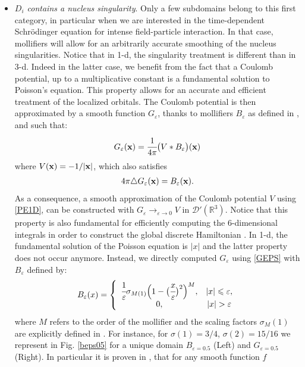 \documentclass[11pt]{elsarticle}
\let \leq \leqslant
\let \epsilon \varepsilon
\newcommand{\R} {\ensuremath{\mathbb{R}}}
\begin{document}
\begin{itemize}
\item {\it $D_i$ contains a nucleus singularity}. Only a few subdomains belong to this first category, in particular when we are interested in the time-dependent Schr\"odinger equation for intense field-particle interaction. In that case, mollifiers will allow for an arbitrarily accurate smoothing of the nucleus singularities. Notice that in 1-d, the singularity treatment is different than in 3-d. Indeed in the latter case, we benefit from the fact that a Coulomb potential, up to a multiplicative constant is a fundamental solution to Poisson's equation. This property allows for an accurate and efficient treatment of the localized orbitals. The Coulomb potential is then approximated by a smooth function $G_{\epsilon}$, thanks to mollifiers $B_{\epsilon}$ as defined in \cite{CAM14-43}, and such that:
\begin{eqnarray}\label{GEPS}
G_{\epsilon}({\bf x}) = \cfrac{1}{4\pi}\big(V*B_{\epsilon}\big)({\bf x})
\end{eqnarray}
where $V({\bf x}) = -1/|{\bf x}|$, which also satisfies
\begin{eqnarray}\label{PE1D}
4\pi \triangle G_{\epsilon}({\bf x}) = B_{\epsilon}({\bf x}).
\end{eqnarray}
As a consequence, a smooth approximation of the Coulomb potential $V$ using \eqref{PE1D}, can be constructed with $G_{\epsilon}\rightarrow_{\epsilon \rightarrow 0}V$ in $\mathcal{D}'(\R^3)$. Notice that this property is also fundamental for efficiently computing the $6$-dimensional integrals in order to construct the global discrete Hamiltonian \cite{CAM14-43}. In 1-d, the fundamental solution of the Poisson equation is $|x|$ and the latter property does not occur anymore. Instead, we directly computed $G_{\epsilon}$ using \eqref{GEPS} with $B_{\epsilon}$ defined by:
\begin{eqnarray}
\label{Beps}
B_{\epsilon}(x)=\left\{
\begin{array}{cc}
\cfrac{1}{\epsilon}\sigma_{M(1)}\Big(1-\big(\cfrac{x}{\epsilon}\big)^2\Big)^M, & |x|\leq \epsilon,\\
0, & |x|>\epsilon
\end{array}
\right.
\end{eqnarray}
where $M$ refers to the order of the mollifier and the scaling factors $\sigma_M(1)$ are explicitly defined in \cite{CAM14-43}. For instance, for $\sigma(1)=3/4$, $\sigma(2)=15/16$ we represent in Fig. \ref{beps05} for a unique domain $B_{\epsilon=0.5}$ (Left) and $G_{\epsilon=0.5}$ (Right). In particular it is proven in \cite{CAM14-43}, that for any smooth function $f$

\end{itemize}
\end{document}

